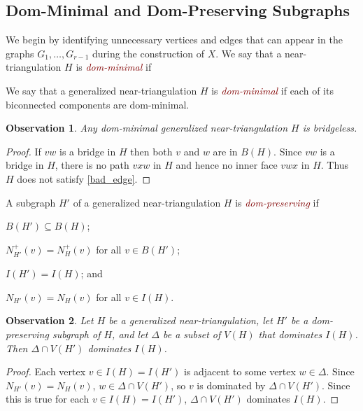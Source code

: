 \documentclass[12pt]{article}
\newtheorem{obs}{Observation}
\newcommand{\defin}[1]{\emph{\textcolor{Maroon}{#1}}}
\theoremstyle{definition}
\begin{document}
\subsection{Dom-Minimal and Dom-Preserving Subgraphs}

We begin by identifying unnecessary vertices and edges that can appear in the graphs $G_1,\ldots,G_{r-1}$ during the construction of $X$.   We say that a near-triangulation $H$ is \defin{dom-minimal} if
We say that a generalized near-triangulation $H$ is \defin{dom-minimal} if each of its biconnected components are dom-minimal.

\begin{obs}\label{bridgeless}
    Any dom-minimal generalized near-triangulation $H$ is bridgeless.
\end{obs}

\begin{proof}
   If $vw$ is a bridge in $H$ then both $v$ and $w$ are in $B(H)$.  Since $vw$ is a bridge in $H$, there is no path $vxw$ in $H$ and hence no inner face $vwx$ in $H$. Thus $H$ does not satisfy \cref{bad_edge}.
\end{proof}

A subgraph $H'$ of a generalized near-triangulation $H$ is \defin{dom-preserving} if
\begin{compactenum}[({DP}1)]
  \item $B(H')\subseteq B(H)$;
  \item $N^+_{H'}(v)=N^+_H(v)$ for all $v\in B(H')$;
  \item $I(H')=I(H)$; and
  \item $N_{H'}(v)=N_H(v)$ for all $v\in I(H)$.
\end{compactenum}

\begin{obs}
  Let $H$ be a generalized near-triangulation, let $H'$ be a dom-preserving subgraph of $H$, and let $\Delta$ be a subset of $V(H)$ that dominates $I(H)$.  Then $\Delta\cap V(H')$ dominates $I(H)$.
\end{obs}

\begin{proof}
  Each vertex $v\in I(H)=I(H')$ is adjacent to some vertex $w\in \Delta$.  Since $N_{H'}(v)=N_H(v)$, $w\in\Delta\cap V(H')$, so $v$ is dominated by $\Delta\cap V(H')$.  Since this is true for each $v\in I(H)=I(H')$, $\Delta\cap V(H')$ dominates $I(H)$.
\end{proof}
\end{document}
